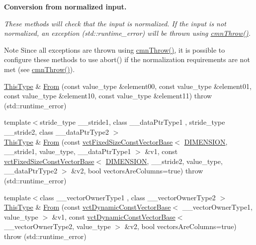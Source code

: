 \begin{Indent}{\bf Conversion from normalized input.}\par
{\em These methods will check that the input is normalized. If the input is not normalized, an exception ({\ttfamily std\+::runtime\+\_\+error}) will be thrown using \hyperlink{_minimal_cmn_8h_ad50e82cf9c9dbd0e6443c13e0d1a6f1a}{cmn\+Throw()}.

\begin{DoxyNote}{Note}
Since all exceptions are thrown using \hyperlink{_minimal_cmn_8h_ad50e82cf9c9dbd0e6443c13e0d1a6f1a}{cmn\+Throw()}, it is possible to configure these methods to use {\ttfamily abort()} if the normalization requirements are not met (see \hyperlink{_minimal_cmn_8h_ad50e82cf9c9dbd0e6443c13e0d1a6f1a}{cmn\+Throw()}). 
\end{DoxyNote}
}\begin{DoxyCompactItemize}
\item 
\hyperlink{classvct_matrix_rotation2_base_a47ffeef2ddecede4b16bcc88fb432ff5}{This\+Type} \& \hyperlink{classvct_matrix_rotation2_base_a73d45665d2dd263429022f275f04b983}{From} (const value\+\_\+type \&element00, const value\+\_\+type \&element01, const value\+\_\+type \&element10, const value\+\_\+type \&element11)  throw (std\+::runtime\+\_\+error)
\item 
{\footnotesize template$<$stride\+\_\+type \+\_\+\+\_\+stride1, class \+\_\+\+\_\+data\+Ptr\+Type1 , stride\+\_\+type \+\_\+\+\_\+stride2, class \+\_\+\+\_\+data\+Ptr\+Type2 $>$ }\\\hyperlink{classvct_matrix_rotation2_base_a47ffeef2ddecede4b16bcc88fb432ff5}{This\+Type} \& \hyperlink{classvct_matrix_rotation2_base_aafcfdc3da313b9b29c0f2eeb663d38d8}{From} (const \hyperlink{classvct_fixed_size_const_vector_base}{vct\+Fixed\+Size\+Const\+Vector\+Base}$<$ \hyperlink{classvct_matrix_rotation2_base_ac10279ed12ec787b1a4833ea02771348acefb9855f54f0cfd782e785c9083e592}{D\+I\+M\+E\+N\+S\+I\+O\+N}, \+\_\+\+\_\+stride1, value\+\_\+type, \+\_\+\+\_\+data\+Ptr\+Type1 $>$ \&v1, const \hyperlink{classvct_fixed_size_const_vector_base}{vct\+Fixed\+Size\+Const\+Vector\+Base}$<$ \hyperlink{classvct_matrix_rotation2_base_ac10279ed12ec787b1a4833ea02771348acefb9855f54f0cfd782e785c9083e592}{D\+I\+M\+E\+N\+S\+I\+O\+N}, \+\_\+\+\_\+stride2, value\+\_\+type, \+\_\+\+\_\+data\+Ptr\+Type2 $>$ \&v2, bool vectors\+Are\+Columns=true)  throw (std\+::runtime\+\_\+error)
\item 
{\footnotesize template$<$class \+\_\+\+\_\+vector\+Owner\+Type1 , class \+\_\+\+\_\+vector\+Owner\+Type2 $>$ }\\\hyperlink{classvct_matrix_rotation2_base_a47ffeef2ddecede4b16bcc88fb432ff5}{This\+Type} \& \hyperlink{classvct_matrix_rotation2_base_a41c9c7b9397b18b3029cfa9754607ba8}{From} (const \hyperlink{classvct_dynamic_const_vector_base}{vct\+Dynamic\+Const\+Vector\+Base}$<$ \+\_\+\+\_\+vector\+Owner\+Type1, value\+\_\+type $>$ \&v1, const \hyperlink{classvct_dynamic_const_vector_base}{vct\+Dynamic\+Const\+Vector\+Base}$<$ \+\_\+\+\_\+vector\+Owner\+Type2, value\+\_\+type $>$ \&v2, bool vectors\+Are\+Columns=true)  throw (std\+::runtime\+\_\+error)

\end{DoxyCompactItemize}
\end{Indent}
